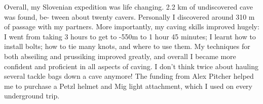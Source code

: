 Overall, my Slovenian expedition was life changing. 2.2 km of undiscovered cave was found, be-
tween about twenty cavers. Personally I discovered around 310 m of passage with my partners. More
importantly, my caving skills improved hugely: I went from taking 3 hours to get to -550m to 1 hour
45 minutes; I learnt how to install bolts; how to tie many knots, and where to use them. My techniques
for both abseiling and prussiking improved greatly, and overall I became more confident and proficient
in all aspects of caving. I don't think twice about hauling several tackle bags down a cave anymore!
The funding from Alex Pitcher helped me to purchase a Petzl helmet and Mig light attachment, which I used on every underground trip.

